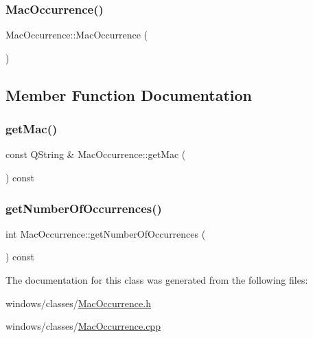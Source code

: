\mbox{\label{class_mac_occurrence_aa897fe4ab6f2a8965c96772fe960bb74}} 
\subsubsection{\texorpdfstring{Mac\+Occurrence()}{MacOccurrence()}\hspace{0.1cm}{\footnotesize\ttfamily [2/2]}}
{\footnotesize\ttfamily Mac\+Occurrence\+::\+Mac\+Occurrence (\begin{DoxyParamCaption}{ }\end{DoxyParamCaption})}



\subsection{Member Function Documentation}
\mbox{\label{class_mac_occurrence_a14f611517db7ea8079db8c386aa13288}} 
\subsubsection{\texorpdfstring{get\+Mac()}{getMac()}}
{\footnotesize\ttfamily const Q\+String \& Mac\+Occurrence\+::get\+Mac (\begin{DoxyParamCaption}{ }\end{DoxyParamCaption}) const}

\mbox{\label{class_mac_occurrence_a0a23b36440fe88fd52cc2b3c148e4081}} 
\subsubsection{\texorpdfstring{get\+Number\+Of\+Occurrences()}{getNumberOfOccurrences()}}
{\footnotesize\ttfamily int Mac\+Occurrence\+::get\+Number\+Of\+Occurrences (\begin{DoxyParamCaption}{ }\end{DoxyParamCaption}) const}



The documentation for this class was generated from the following files\+:\begin{DoxyCompactItemize}
\item 
windows/classes/\hyperlink{_mac_occurrence_8h}{Mac\+Occurrence.\+h}\item 
windows/classes/\hyperlink{_mac_occurrence_8cpp}{Mac\+Occurrence.\+cpp}\end{DoxyCompactItemize}
